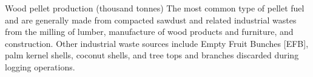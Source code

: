\begin{MetadataCollection} {}
\begin{metadata}{Wood pellet production (thousand tonnes)} {}
The most common type of pellet fuel and are generally made from compacted sawdust and related industrial wastes from the milling of lumber, manufacture of wood products and furniture, and construction. Other industrial waste sources include Empty Fruit Bunches [EFB], palm kernel shells, coconut shells, and tree tops and branches discarded during logging operations.
\end{metadata}

\onecolumn

{}

\clearpage

\end{MetadataCollection}
